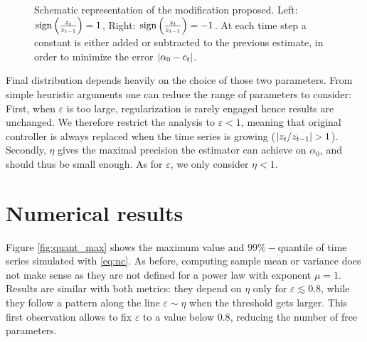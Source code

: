 \documentclass[FinalReport.tex]{subfiles}
\begin{document}
\begin{figure}
\centering
{}
\caption{Schematic representation of the modification proposed. Left: $\text{sign}\left(\frac{z_t}{z_{t-1}}\right)=1$, Right: $\text{sign}\left(\frac{z_t}{z_{t-1}}\right)=-1$. At each time step a constant is either added or subtracted to the previous estimate, in order to minimize the error $\abs{\alpha_0-c_t}$.}
\label{fig:new_cont_scheme}
\end{figure}
Final distribution depends heavily on the choice of those two parameters. From simple heuristic arguments one can reduce the range of parameters to consider: First, when $\varepsilon$ is too large, regularization is rarely engaged hence results are unchanged. We therefore restrict the analysis to $\varepsilon<1$, meaning that original controller is always replaced when the time series is growing ($\abs{z_t/z_{t-1}}>1$). Secondly, $\eta$ gives the maximal precision the estimator can achieve on $\alpha_0$, and should thus be small enough. As for $\varepsilon$, we only consider $\eta<1$.



\section{Numerical results}
Figure \ref{fig:quant_max} shows the maximum value and $99\%-$quantile of time series simulated with \eqref{eq:nc}. As before, computing sample mean or variance does not make sense as they are not defined for a power law with exponent $\mu=1$. 
Results are similar with both metrics: they depend on $\eta$ only for $\varepsilon\lesssim 0.8$, while they follow a pattern along the line $\varepsilon\sim\eta$ when the threshold gets larger. This first observation allows to fix $\varepsilon$ to a value below $0.8$, reducing the number of free parameters.
\end{document}

